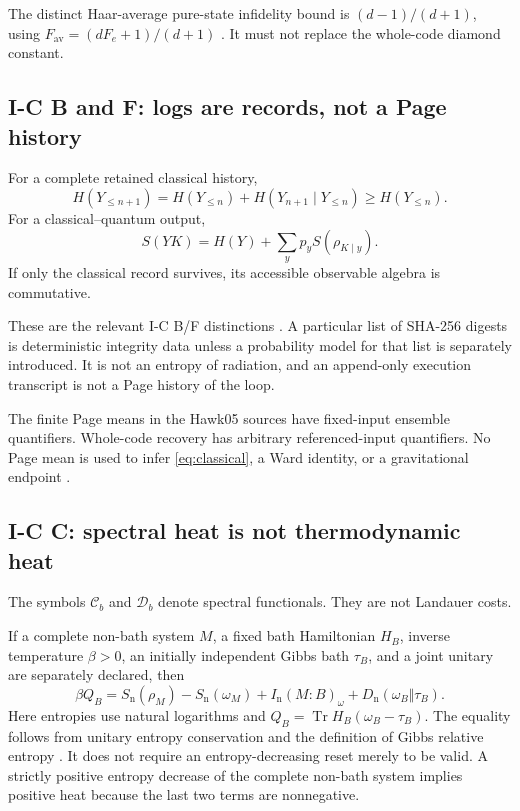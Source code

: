 \documentclass[11pt,a4paper]{article}
\newcommand{\Tr}{\operatorname{Tr}}
\newcommand{\Ccal}{\mathcal C}
\newcommand{\Dcal}{\mathcal D}
\theoremstyle{plain}
\theoremstyle{definition}
\theoremstyle{remark}
\numberwithin{equation}{section}
\begin{document}
The distinct Haar-average pure-state infidelity bound is
\((d-1)/(d+1)\), using
\(F_{\mathrm{av}}=(dF_e+1)/(d+1)\)
\cite{NielsenAverage}. It must not replace the whole-code
diamond constant.

\subsection{I-C B and F: logs are records, not a Page history}

For a complete retained classical history,
\[
 H(Y_{\le n+1})
 =H(Y_{\le n})+H(Y_{n+1}\mid Y_{\le n})
 \ge H(Y_{\le n}).
\]
For a classical--quantum output,
\[
 S(YK)=H(Y)+\sum_y p_yS(\rho_{K\mid y}).
\]
If only the classical record survives, its accessible observable
algebra is commutative.

These are the relevant I-C B/F distinctions
\cite{CheungIC}. A particular list of SHA-256 digests is
deterministic integrity data unless a probability model for that
list is separately introduced. It is not an entropy of radiation,
and an append-only execution transcript is not a Page history
of the loop.

The finite Page means in the Hawk05 sources have fixed-input
ensemble quantifiers. Whole-code recovery has arbitrary
referenced-input quantifiers. No Page mean is used to infer
\eqref{eq:classical}, a Ward identity, or a gravitational endpoint
\cite{CheungHawk05}.

\subsection{I-C C: spectral heat is not thermodynamic heat}

The symbols \(\Ccal_b\) and \(\Dcal_b\) denote spectral
functionals. They are not Landauer costs.

If a complete non-bath system \(M\), a fixed bath Hamiltonian
\(H_B\), inverse temperature \(\beta>0\), an initially independent
Gibbs bath \(\tau_B\), and a joint unitary are separately declared,
then
\begin{equation}
 \beta Q_B
 =S_{\mathrm n}(\rho_M)-S_{\mathrm n}(\omega_M)
  +I_{\mathrm n}(M:B)_\omega
  +D_{\mathrm n}(\omega_B\Vert\tau_B).
 \label{eq:thermal}
\end{equation}
Here entropies use natural logarithms and
\(Q_B=\Tr H_B(\omega_B-\tau_B)\).
The equality follows from unitary entropy conservation and the
definition of Gibbs relative entropy
\cite{ReebWolf}. It does not require an entropy-decreasing reset
merely to be valid. A strictly positive entropy decrease of the
complete non-bath system implies positive heat because the last
two terms are nonnegative.
\end{document}
